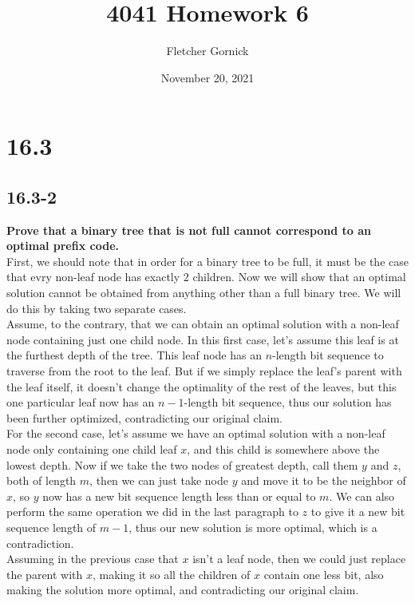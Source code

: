 \documentclass[11pt]{article}
\title{\vspace{-1.0cm}4041 Homework 6}
\author{Fletcher Gornick}
\date{November 20, 2021}
\begin{document}
 \maketitle 

 \section*{16.3}
 \subsection*{16.3-2}
 \textbf{Prove that a binary tree that is not full cannot correspond to an optimal prefix code.} \\

 First, we should note that in order for a binary tree to be full, it must be the case that evry 
 non-leaf node has exactly 2 children.  Now we will show that an optimal solution cannot be obtained 
 from anything other than a full binary tree.  We will do this by taking two separate cases. \\

 Assume, to the contrary, that we can obtain an optimal solution with a non-leaf node containing just 
 one child node.  In this first case, let's assume this leaf is at the furthest depth of the tree.  
 This leaf node has an $n$-length bit sequence to traverse from the root to the leaf.  But if we 
 simply replace the leaf's parent with the leaf itself, it doesn't change the optimality of the rest 
 of the leaves, but this one particular leaf now has an $n-1$-length bit sequence, thus our solution 
 has been further optimized, contradicting our original claim. \\

 For the second case, let's assume we have an optimal solution with a non-leaf node only containing 
 one child leaf  $x$, and this child is somewhere above the lowest depth.  Now if we take the two 
 nodes of greatest depth, call them $y$ and $z$, both of length $m$, then we can just take node $y$ 
 and move it to be the neighbor of $x$, so $y$ now has a new bit sequence length less than or equal 
 to $m$. We can also perform the same operation we did in the last paragraph to $z$ to give it a new 
 bit sequence length of $m-1$, thus our new solution is more optimal, which is a contradiction. \\ 

 Assuming in the previous case that $x$ isn't a leaf node, then we could just replace the parent with 
 $x$, making it so all the children of $x$ contain one less bit, also making the solution more 
 optimal, and contradicting our original claim.
\end{document}
